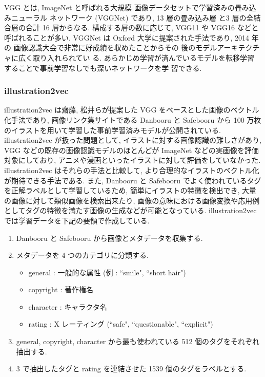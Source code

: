 VGG \cite{brusilovsky:simonyan2014very} とは, ImageNet \cite{imagenet_cvpr09} と呼ばれる大規模
画像データセットで学習済みの畳み込みニューラル
ネットワーク (VGGNet) であり, 13 層の畳み込み層
と3 層の全結合層の合計 16 層からなる. 構成する層の数に応じて, VGG11 や VGG16 などと呼ばれることが多い. VGGNet は Oxford 大学に提案された手法であり, 2014 年の
画像認識大会で非常に好成績を収めたことからその
後のモデルアーキテクチャに広く取り入れられてい
る. あらかじめ学習が済んでいるモデルを転移学習
することで事前学習なしでも深いネットワークを学
習できる.

\changeindent{0cm}
\subsubsection{illustration2vec}
\changeindent{2cm}

illustration2vec \cite{i2v} は齋藤, 松井らが提案した VGG をベースとした画像のベクトル化手法であり, 画像リンク集サイトである Danbooru と Safebooru から 100 万枚のイラストを用いて学習した事前学習済みモデルが公開されている. illustration2vec が扱った問題として, イラストに対する画像認識の難しさがあり, VGG などの既存の画像認識モデルのほとんどが ImageNet などの実画像を評価対象にしており, アニメや漫画といったイラストに対して評価をしていなかった. illustration2vec はそれらの手法と比較して, より合理的なイラストのベクトル化が期待できる手法である. また, Danbooru と Safebooru でよく使われているタグを正解ラベルとして学習しているため, 簡単にイラストの特徴を検出でき, 大量の画像に対して類似画像を検索出来たり, 画像の意味における画像変換や応用例としてタグの特徴を満たす画像の生成などが可能となっている.
\newpage
illustration2vec では学習データを下記の要領で作成している.

\begin{enumerate}
  \item Danbooru と Safebooru から画像とメタデータを収集する.
  \item メタデータを 4 つのカテゴリに分類する.
        \begin{itemize}
          \item general : 一般的な属性 (例 : ``smile", ``short hair")
          \item copyright : 著作権名
          \item character : キャラクタ名
          \item rating : X レーティング (``safe", ``questionable", ``explicit")
        \end{itemize}
  \item general, copyright, character から最も使われている 512 個のタグをそれぞれ抽出する.
  \item 3 で抽出したタグと rating を連結させた 1539 個のタグをラベルとする.
\end{enumerate}
